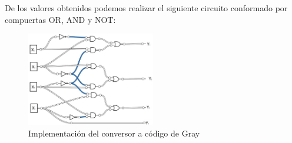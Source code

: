 \begin{center}
%  
\end{center}
De los valores obtenidos podemos realizar el siguiente circuito conformado por compuertas OR, AND y NOT:\\
\begin{figure}[H]
	\centering
    \includegraphics[width=0.5\textwidth]{Ejercicio_4/Circuito}
    \caption{Implementación del conversor a código de Gray}
\end{figure}
